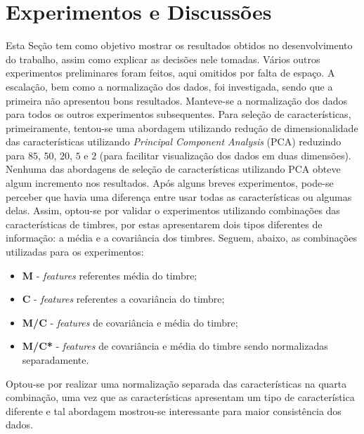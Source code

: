 \documentclass[conference]{IEEEtran}
\begin{document}



\section{Experimentos e Discussões} \label{sec:exp}

Esta Seção tem como objetivo mostrar os resultados obtidos no desenvolvimento do trabalho, assim como explicar as decisões nele tomadas. Vários outros experimentos preliminares foram feitos, aqui omitidos por falta de espaço. A escalação, bem como a normalização dos dados, foi investigada, sendo que a primeira não apresentou bons resultados. Manteve-se a normalização dos dados para todos os outros experimentos subsequentes. Para seleção de características, primeiramente, tentou-se uma abordagem utilizando redução de dimensionalidade das características utilizando \textit{Principal Component Analysis} (PCA) reduzindo para $85$, $50$, $20$, $5$ e $2$ (para facilitar visualização dos dados em duas dimensões). Nenhuma das abordagens de seleção de características utilizando PCA obteve algum incremento nos resultados. Após alguns breves experimentos, pode-se perceber que havia uma diferença entre usar todas as características ou algumas delas. Assim, optou-se por validar o experimentos utilizando combinações das características de timbres, por estas apresentarem dois tipos diferentes de informação: a média e a covariância dos timbres. Seguem, abaixo, as combinações utilizadas para os experimentos:

\begin{itemize}
	\item \textbf{M} - \emph{features} referentes média do timbre;
	\item \textbf{C} - \emph{features} referentes a covariância do timbre;
	\item \textbf{M/C} - \emph{features} de covariância e média do timbre;
	\item \textbf{M/C*} - \emph{features} de covariância e média do timbre sendo normalizadas separadamente.
\end{itemize}

Optou-se por realizar uma normalização separada das características na quarta combinação, uma vez que as características apresentam um tipo de característica diferente e tal abordagem mostrou-se interessante para maior consistência dos dados.
\end{document}
